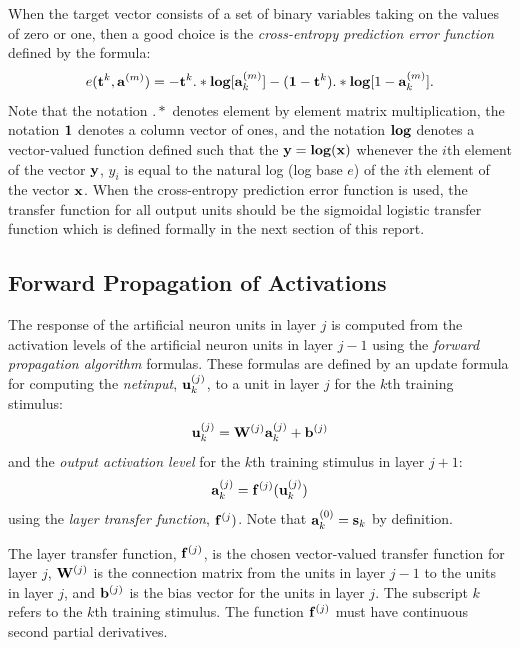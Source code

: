 \documentclass{report}
\begin{document}
When the target vector consists of a set of binary variables taking on
the values of zero or one, then a good choice is the
{\em cross-entropy prediction error function} defined by the
formula:
\begin{equation}\label{xentropyfunk}
e({\bf t}^k, {\bf a}^{(m)}) =
-{\bf t}^k .* {\bf log} [{\bf a}^{(m)}_k] - ({\bf 1} - {\bf t}^k) .*
{\bf log} [1 - {\bf a}^{(m)}_k].
\end{equation}
Note that the notation $.*$ denotes element by element matrix
multiplication, the notation ${\bf 1}$ denotes a column vector of
ones, and the notation ${\bf log}$ denotes a vector-valued function
defined such that the ${\bf y} = {\bf log}({\bf x})$ whenever the
$i$th element of the vector ${\bf y}$, $y_i$ is equal to the natural
log (log base $e$) of the $i$th element of the vector ${\bf x}$. When
the cross-entropy prediction error function is used, the transfer
function for all output units should be the sigmoidal logistic
transfer function which is defined formally in the next section of
this report.

\subsection{Forward Propagation of Activations}

The response of the artificial neuron units in layer $j$ is computed
from the activation levels of the artificial neuron units in layer
$j-1$ using the {\em forward propagation algorithm} formulas. These
formulas are defined by an update formula for computing the {\em
netinput}, ${\bf u}^{(j)}_k$, to a unit in layer $j$ for the $k$th
training stimulus:
\begin{equation}
\label{fwd1}
{\bf u}^{(j)}_k = {\bf W}^{(j)} {\bf a}^{(j)}_k + {\bf b}^{(j)}
\end{equation}
and the {\em output activation level} for the $k$th training stimulus
in layer $j+1$:
\begin{equation}
\label{fwd2}
{\bf a}^{(j)}_k = {\bf f}^{(j)}({\bf u}^{(j)}_k)
\end{equation}
using the {\em layer transfer function}, ${\bf f}^{(j})$.
Note that ${\bf a}^{(0)}_k = {\bf s}_k$ by definition.

The layer transfer function, ${\bf f}^{(j)}$, is the chosen
vector-valued transfer function for layer $j$, ${\bf W}^{(j)}$ is the
connection matrix from the units in layer $j-1$ to the units in layer
$j$, and ${\bf b}^{(j)}$ is the bias vector for the units in layer
$j$. The subscript $k$ refers to the $k$th training stimulus. The
function ${\bf f}^{(j)}$ must have continuous second partial
derivatives.
\end{document}
